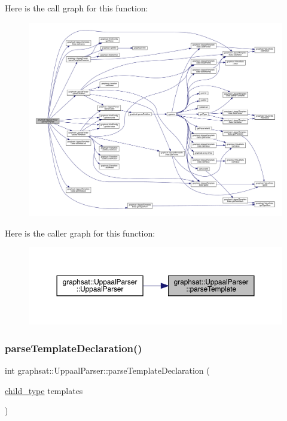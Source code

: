 Here is the call graph for this function\+:
\nopagebreak
\begin{figure}[H]
\begin{center}
\leavevmode
\includegraphics[width=350pt]{classgraphsat_1_1_uppaal_parser_a65d4465e1a96053627ef222a05a22356_cgraph}
\end{center}
\end{figure}
Here is the caller graph for this function\+:
\nopagebreak
\begin{figure}[H]
\begin{center}
\leavevmode
\includegraphics[width=350pt]{classgraphsat_1_1_uppaal_parser_a65d4465e1a96053627ef222a05a22356_icgraph}
\end{center}
\end{figure}
\mbox{\label{classgraphsat_1_1_uppaal_parser_a458fdbf8c38c19215b191bc6a992d38e}} 
\subsubsection{\texorpdfstring{parseTemplateDeclaration()}{parseTemplateDeclaration()}}
{\footnotesize\ttfamily int graphsat\+::\+Uppaal\+Parser\+::parse\+Template\+Declaration (\begin{DoxyParamCaption}\item[{\mbox{\hyperlink{namespacegraphsat_aba2f5cf076d49898cc0469bee94d3a05}{child\+\_\+type}}}]{templates }\end{DoxyParamCaption})\hspace{0.3cm}{\ttfamily [private]}}

